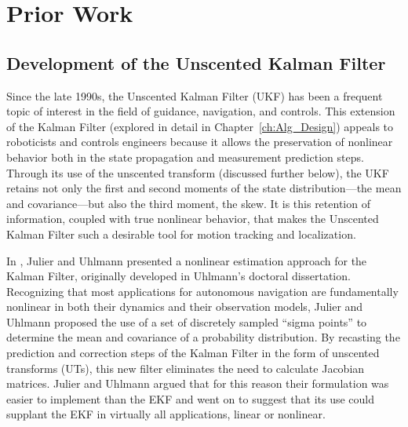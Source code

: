 \chapter{Prior Work} \label{ch:Prior_Work}

\section{Development of the Unscented Kalman Filter}

Since the late 1990s, the Unscented Kalman Filter (UKF) has been a frequent topic of interest in the field of guidance, navigation, and controls. This extension of the Kalman Filter (explored in detail in Chapter~\ref{ch:Alg_Design}) appeals to roboticists and controls engineers because it allows the preservation of nonlinear behavior both in the state propagation and measurement prediction steps. Through its use of the unscented transform (discussed further below), the UKF retains not only the first and second moments of the state distribution---the mean and covariance---but also the third moment, the skew. It is this retention of information, coupled with true nonlinear behavior, that makes the Unscented Kalman Filter such a desirable tool for motion tracking and localization.

In \cite{Julier1997}, Julier and Uhlmann presented a nonlinear estimation approach for the Kalman Filter, originally developed in Uhlmann's doctoral dissertation. Recognizing that most applications for autonomous navigation are fundamentally nonlinear in both their dynamics and their observation models, Julier and Uhlmann proposed the use of a set of discretely sampled ``sigma points'' to determine the mean and covariance of a probability distribution. By recasting the prediction and correction steps of the Kalman Filter in the form of unscented transforms (UTs), this new filter eliminates the need to calculate Jacobian matrices. Julier and Uhlmann argued that for this reason their formulation was easier to implement than the EKF and went on to suggest that its use could supplant the EKF in virtually all applications, linear or nonlinear.

